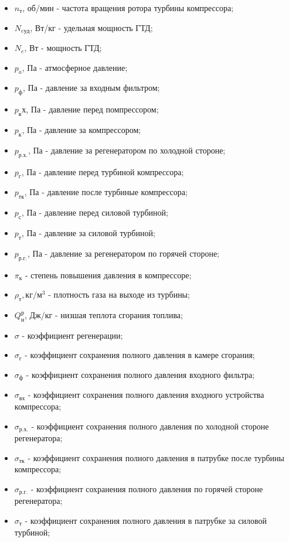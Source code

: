 \begin{itemize}
    \item[] $n_т$, об/мин - частота вращения ротора турбины компрессора;
    \item[] $N_{e уд}$, Вт/кг - удельная мощность ГТД;
    \item[] $N_e$, Вт - мощность ГТД;
    \item[] $p_a$, Па - атмосферное давление;
    \item[] $p_ф$, Па - давление за входным фильтром;
    \item[] $p_вх$, Па - давление перед помпрессором;
    \item[] $p_к$, Па - давление за компрессором;
    \item[] $p_{р.х.}$, Па - давление за регенератором по холодной стороне;
    \item[] $p_г$, Па - давление перед турбиной компрессора;
    \item[] $p_{тк}$, Па - давление после турбиные компрессора;
    \item[] $p_с$, Па - давление перед силовой турбиной;
    \item[] $p_т$, Па - давление за силовой турбиной;
    \item[] $p_{р.г.}$, Па - давление за регенератором по горячей стороне;
    \item[] $\pi_к$ - степень повышения давления в компрессоре;
    \item[] $\rho_т, кг/м^3$ - плотность газа на выходе из турбины;
    \item[] $Q_н^р$, Дж/кг - низшая теплота сгорания топлива;
    \item[] $\sigma$ - коэффициент регенерации;
    \item[] $\sigma_г$ - коэффициент сохранения полного давления в камере сгорания;
    \item[] $\sigma_ф$ - коэффициент сохранения полного давления входного фильтра;
    \item[] $\sigma_{вх}$ - коэффициент сохранения полного давления входного устройства компрессора;
    \item[] $\sigma_{р.х.}$ - коэффициент сохранения полного давления по холодной стороне регенератора;
    \item[] $\sigma_{тк}$ - коэффициент сохранения полного давления в патрубке после турбины компрессора;
    \item[] $\sigma_{р.г.}$ - коэффициент сохранения полного давления по горячей стороне регенератора;
    \item[] $\sigma_т$ - коэффициент сохранения полного давления в патрубке за силовой турбиной;

\end{itemize}
